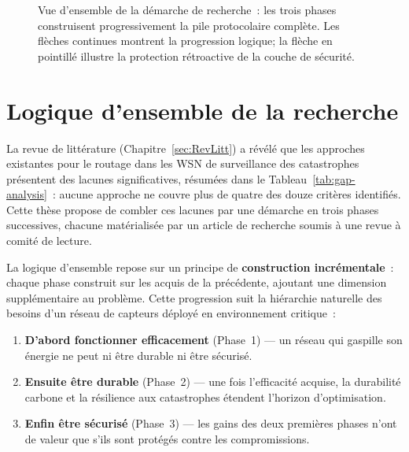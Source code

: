\begin{figure}[htbp]
\caption{Vue d'ensemble de la démarche de recherche~: les trois phases construisent progressivement la pile protocolaire complète. Les flèches continues montrent la progression logique; la flèche en pointillé illustre la protection rétroactive de la couche de sécurité.}
\label{fig:demarche-globale}
\end{figure}


\section{Logique d'ensemble de la recherche}\label{sec:demarche-logique}

La revue de littérature (Chapitre~\ref{sec:RevLitt}) a révélé que les approches existantes pour le routage dans les WSN de surveillance des catastrophes présentent des lacunes significatives, résumées dans le Tableau~\ref{tab:gap-analysis}~: aucune approche ne couvre plus de quatre des douze critères identifiés. Cette thèse propose de combler ces lacunes par une démarche en trois phases successives, chacune matérialisée par un article de recherche soumis à une revue à comité de lecture.

La logique d'ensemble repose sur un principe de \textbf{construction incrémentale}~: chaque phase construit sur les acquis de la précédente, ajoutant une dimension supplémentaire au problème. Cette progression suit la hiérarchie naturelle des besoins d'un réseau de capteurs déployé en environnement critique~:

\begin{enumerate}
    \item \textbf{D'abord fonctionner efficacement} (Phase~1) --- un réseau qui gaspille son énergie ne peut ni être durable ni être sécurisé.
    \item \textbf{Ensuite être durable} (Phase~2) --- une fois l'efficacité acquise, la durabilité carbone et la résilience aux catastrophes étendent l'horizon d'optimisation.
    \item \textbf{Enfin être sécurisé} (Phase~3) --- les gains des deux premières phases n'ont de valeur que s'ils sont protégés contre les compromissions.
\end{enumerate}

